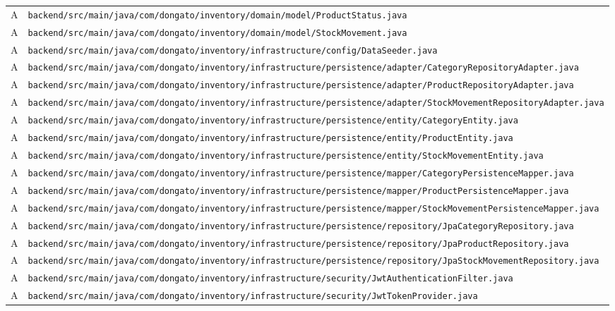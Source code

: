 \documentclass[11pt,oneside]{report}
\newcommand{\pathcode}[1]{{\ttfamily\scriptsize\nolinkurl{#1}}}
\begin{document}
\begin{longtable}{p{1.5cm} p{13cm}}
A & \pathcode{backend/src/main/java/com/dongato/inventory/domain/model/ProductStatus.java}\\
A & \pathcode{backend/src/main/java/com/dongato/inventory/domain/model/StockMovement.java}\\
A & \pathcode{backend/src/main/java/com/dongato/inventory/infrastructure/config/DataSeeder.java}\\
A & \pathcode{backend/src/main/java/com/dongato/inventory/infrastructure/persistence/adapter/CategoryRepositoryAdapter.java}\\
A & \pathcode{backend/src/main/java/com/dongato/inventory/infrastructure/persistence/adapter/ProductRepositoryAdapter.java}\\
A & \pathcode{backend/src/main/java/com/dongato/inventory/infrastructure/persistence/adapter/StockMovementRepositoryAdapter.java}\\
A & \pathcode{backend/src/main/java/com/dongato/inventory/infrastructure/persistence/entity/CategoryEntity.java}\\
A & \pathcode{backend/src/main/java/com/dongato/inventory/infrastructure/persistence/entity/ProductEntity.java}\\
A & \pathcode{backend/src/main/java/com/dongato/inventory/infrastructure/persistence/entity/StockMovementEntity.java}\\
A & \pathcode{backend/src/main/java/com/dongato/inventory/infrastructure/persistence/mapper/CategoryPersistenceMapper.java}\\
A & \pathcode{backend/src/main/java/com/dongato/inventory/infrastructure/persistence/mapper/ProductPersistenceMapper.java}\\
A & \pathcode{backend/src/main/java/com/dongato/inventory/infrastructure/persistence/mapper/StockMovementPersistenceMapper.java}\\
A & \pathcode{backend/src/main/java/com/dongato/inventory/infrastructure/persistence/repository/JpaCategoryRepository.java}\\
A & \pathcode{backend/src/main/java/com/dongato/inventory/infrastructure/persistence/repository/JpaProductRepository.java}\\
A & \pathcode{backend/src/main/java/com/dongato/inventory/infrastructure/persistence/repository/JpaStockMovementRepository.java}\\
A & \pathcode{backend/src/main/java/com/dongato/inventory/infrastructure/security/JwtAuthenticationFilter.java}\\
A & \pathcode{backend/src/main/java/com/dongato/inventory/infrastructure/security/JwtTokenProvider.java}\\

\end{longtable}
\end{document}
